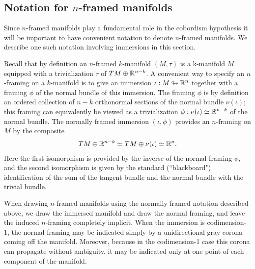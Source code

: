 \documentclass{amsart}
\begin{document}
\subsection{Notation for $n$-framed manifolds} 

Since $n$-framed manifolds play a fundamental role in the cobordism hypothesis it will be important to have convenient notation to denote $n$-framed manifolds.  We describe one such notation involving immersions in this section.

Recall that by definition an $n$-framed $k$-manifold $(M,\tau)$ is a k-manifold $M$ equipped with a trivialization $\tau$ of $TM \oplus \mathbb R^{n-k}$.  A convenient way to specify an $n$-framing on a $k$-manifold is to give an immersion $\iota: M \looparrowright \mathbb R^n$ together with a framing $\phi$ of the normal bundle of this immersion.  The framing $\phi$ is by definition an ordered collection of $n-k$ orthonormal sections of the normal bundle $\nu(\iota)$; this framing can equivalently be viewed as a trivialization $\phi: \nu(\iota) \simeq \mathbb R^{n-k}$ of the normal bundle.  The normally framed immersion $(\iota, \phi)$ provides an $n$-framing on $M$ by the composite
\[TM \oplus \mathbb R^{n-k} \simeq TM \oplus \nu(\iota) \simeq  \mathbb R^n.\]
Here the first isomorphism is provided by the inverse of the normal framing $\phi$, and the second isomorphism is given by the standard (``blackboard") identification of the sum of the tangent bundle and the normal bundle with the trivial bundle.

When drawing $n$-framed manifolds using the normally framed notation described above, we draw the immersed manifold and draw the normal framing, and leave the induced $n$-framing completely implicit.  When the immersion is codimension-1, the normal framing may be indicated simply by a unidirectional gray corona coming off the manifold.  Moreover, because in the codimension-1 case this corona can propagate without ambiguity, it may be indicated only at one point of each component of the manifold.
\end{document}
